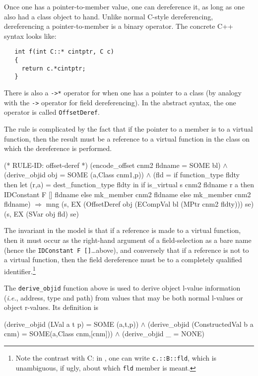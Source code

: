 \documentclass[11pt]{article}
\newcommand{\ie}{\emph{i.e.}}
\begin{document}
\bigskip\noindent
Once one has a pointer-to-member value, one can dereference it, as
long as one also had a class object to hand.  Unlike normal C-style
dereferencing, dereferencing a pointer-to-member is a binary
operator.  The concrete C++ syntax looks like:
\begin{verbatim}
   int f(int C::* cintptr, C c)
   {
     return c.*cintptr;
   }
\end{verbatim}
There is also a \texttt{->*} operator for when one has a pointer to a
class (by analogy with the \texttt{->} operator for field
dereferencing).  In the abstract syntax, the one operator is called
\texttt{OffsetDeref}.

The rule is complicated by the fact that if the pointer to a member is
to a virtual function, then the result must be a reference to a
virtual function in the class on which the dereference is
performed.%
%
\begin{stdrule}
(* RULE-ID: offset-deref *)
     (encode_offset cnm2 fldname = SOME bl) \(\land\)
     (derive_objid obj = SOME (a,Class cnm1,p)) \(\land\)
     (fld = if function_type fldty then
              let (r,a) = dest_function_type fldty
              in
                if is_virtual s cnm2 fldname r a then
                  IDConstant F [] fldname
                else
                  mk_member cnm2 fldname
            else
              mk_member cnm2 fldname)
   \(\Rightarrow\)
     mng (s, EX (OffsetDeref obj
                  (ECompVal bl (MPtr cnm2 fldty)))
                se)
         (s, EX (SVar obj fld) se)
\end{stdrule}
The invariant in the model is that if a reference is made to a virtual
function, then it must occur as the right-hand argument of a
field-selection as a bare name (hence the
\texttt{IDConstant~F~[]}\dots above), and conversely that if a
reference is not to a virtual function, then the field dereference
must be to a completely qualified identifier.\footnote{Note the
  contrast with C: in \cpp, one can write \texttt{c.::B::fld}, which
  is unambiguous, if ugly, about which \texttt{fld} member is meant.}

The \texttt{derive_objid}
function above is used to derive object l-value information (\ie,
address, type and path) from values that may be both normal l-values
or object r-values.  Its definition is
\begin{stdrule}
   (derive_objid (LVal a t p) = SOME (a,t,p)) \(\land\)
   (derive_objid (ConstructedVal b a cnm) =
         SOME(a,Class cnm,[cnm])) \(\land\)
   (derive_objid _ = NONE)
\end{stdrule}
\end{document}
